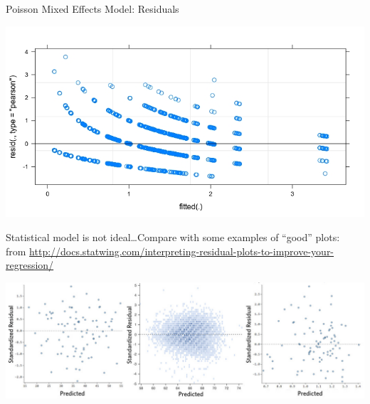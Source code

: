\documentclass[13pt, t]{beamer}
\begin{document}
\begin{frame}{Poisson Mixed Effects Model: Residuals}
\begin{center}
\includegraphics[width=0.75\linewidth]{images/14_poisson_residuals_750_400}\\
\end{center}\pause
Statistical model is not ideal\dots Compare with some examples of ``good'' plots:\\
{\tiny from \url{http://docs.statwing.com/interpreting-residual-plots-to-improve-your-regression/}}
\begin{center}
\includegraphics[width=0.7\linewidth]{images/16_good_residuals}
\end{center}
\end{frame}
\end{document}
